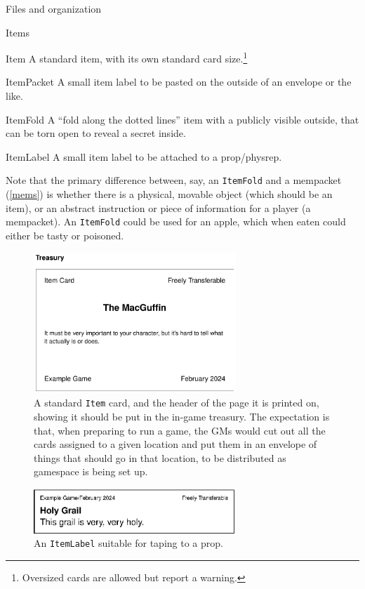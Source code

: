 \documentclass[sheet]{GameTexBase}
\begin{document}
\begin{section}{Files and organization}
\begin{subsection}{Items}
\begin{desc}
\item[Item] A standard item, with its own standard card size.\footnote{Oversized cards are allowed but report a warning.}
\item[ItemPacket] A small item label to be pasted on the outside of an envelope or the like.
\item[ItemFold] A ``fold along the dotted lines'' item with a publicly visible outside, that can be torn open to reveal a secret inside.
\item[ItemLabel] A small item label to be attached to a prop/physrep.
\end{desc}

Note that the primary difference between, say, an \lstinline|ItemFold| and a mempacket (\ref{mems}) is whether there is a physical, movable object (which should be an item), or an abstract instruction or piece of information for a player (a mempacket).  An \lstinline|ItemFold| could be used for an apple, which when eaten could either be tasty or poisoned.
\begin{figure}
\centering
\includegraphics[width=3in]{item-card}
\caption{A standard \lstinline|Item| card, and the header of the page it is printed on, showing it should be put in the in-game treasury.  The expectation is that, when preparing to run a game, the GMs would cut out all the cards assigned to a given location and put them in an envelope of things that should go in that location, to be distributed as gamespace is being set up.
}
\label{itemcardfig}
\end{figure}\begin{figure}
\centering
\includegraphics[width=3in]{item-label}
\caption{An \lstinline|ItemLabel| suitable for taping to a prop.}
\end{figure}

\end{subsection}
\end{section}
\end{document}

